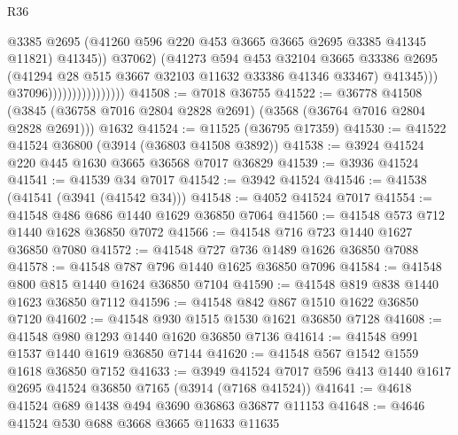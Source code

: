 \begin{lexlean}{R36}
\begin{coremodule}
                                              @3385
                                              @2695
                                              (@41260
                                                @596
                                                @220
                                                @453
                                                @3665
                                                @3665
                                                @2695
                                                @3385
                                                @41345
                                                @11821)
                                              @41345))
                                          @37062)
                                        (@41273
                                          @594
                                          @453
                                          @32104
                                          @3665
                                          @33386
                                          @2695
                                          (@41294 @28 @515 @3667 @32103 @11632 @33386 @41346 @33467)
                                          @41345)))
                                    @37096))))))))))))))))
@41508 := @7018 @36755
@41522 := @36778
    @41508
    (@3845 (@36758 @7016 @2804 @2828 @2691) (@3568 (@36764 @7016 @2804 @2828 @2691)))
    @1632
@41524 := @11525 (@36795 @17359)
@41530 := @41522 @41524 @36800 (@3914 (@36803 @41508 @3892))
@41538 := @3924 @41524 @220 @445 @1630 @3665 @36568 @7017 @36829
@41539 := @3936 @41524
@41541 := @41539 @34 @7017
@41542 := @3942 @41524
@41546 := @41538 (@41541 (@3941 (@41542 @34)))
@41548 := @4052 @41524 @7017
@41554 := @41548 @486 @686 @1440 @1629 @36850 @7064
@41560 := @41548 @573 @712 @1440 @1628 @36850 @7072
@41566 := @41548 @716 @723 @1440 @1627 @36850 @7080
@41572 := @41548 @727 @736 @1489 @1626 @36850 @7088
@41578 := @41548 @787 @796 @1440 @1625 @36850 @7096
@41584 := @41548 @800 @815 @1440 @1624 @36850 @7104
@41590 := @41548 @819 @838 @1440 @1623 @36850 @7112
@41596 := @41548 @842 @867 @1510 @1622 @36850 @7120
@41602 := @41548 @930 @1515 @1530 @1621 @36850 @7128
@41608 := @41548 @980 @1293 @1440 @1620 @36850 @7136
@41614 := @41548 @991 @1537 @1440 @1619 @36850 @7144
@41620 := @41548 @567 @1542 @1559 @1618 @36850 @7152
@41633 := @3949 @41524 @7017 @596 @413 @1440 @1617 @2695 @41524 @36850 @7165 (@3914 (@7168 @41524))
@41641 := @4618 @41524 @689 @1438 @494 @3690 @36863 @36877 @11153
@41648 := @4646 @41524 @530 @688 @3668 @3665 @11633 @11635

\end{coremodule}
\end{lexlean}
